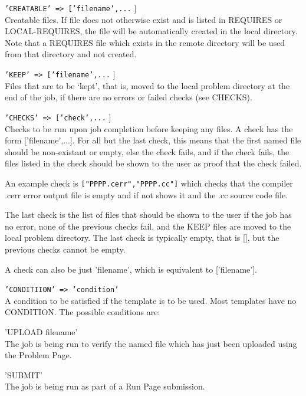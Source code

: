 \documentclass[12pt]{article}
\newenvironment{indpar}[1][0.4in]%
	{\begin{list}{}%
		     {\setlength{\itemsep}{0in}%
		      \setlength{\topsep}{0in}%
		      \setlength{\parsep}{1ex}%
		      \setlength{\labelwidth}{#1}%
		      \setlength{\leftmargin}{#1}%
		      \addtolength{\leftmargin}{\labelsep}}%
	 \item}%
	{\end{list}}
\newenvironment{itemlist}[1][0.2in]%
	{\begin{list}{}{\setlength{\labelwidth}{#1}%
		        \setlength{\leftmargin}{\labelwidth}%
		        \addtolength{\leftmargin}{+0.2in}%
		        \addtolength{\linewidth}{-\labelwidth}%
		        \addtolength{\linewidth}{-0.2in}%
		        \renewcommand{\makelabel}[1]{##1\hfill}}
	 \raggedright}%
	{\end{list}}
\begin{document}
\begin{indpar}[0.2in]
\begin{itemlist}
\item[\tt 'CREATABLE' => ['filename',...]] ~ \\
Creatable files.  If file does not otherwise exist and is
listed in REQUIRES or LOCAL-REQUIRES, the file will be automatically
created in the local directory.  Note that a REQUIRES file which
exists in the remote directory will be used from that directory
and not created.

\item[\tt 'KEEP' => ['filename',...]] ~ \\
Files that are to be `kept', that is, moved to the local problem
directory at the end of the job, if there are no errors or failed
checks (see CHECKS).

\item[\tt 'CHECKS' => ['check',...]] ~ \\
Checks to be run upon job completion before keeping any files.
A check has the form ['filename',...].   For all but the last
check, this means that the first named file should be non-existant
or empty, else the check fails, and if the check fails,
the files listed in the check should be shown to the user as
proof that the check failed.

An example check is \verb|["PPPP.cerr","PPPP.cc"]| which checks
that the compiler .cerr error output file is empty and if not
shows it and the .cc source code file.

The last check is the list of files
that should be shown to the user if the job has no error, none
of the previous checks fail, and the KEEP files are moved to the
local problem directory.  The last check is typically empty, that is [],
but the previous checks cannot be empty.

A check can also be just 'filename',
which is equivalent to ['filename'].

\item[\tt 'CONDITIION' => 'condition'] ~ \\
A condition to be satisfied if the template is to be used.
Most templates have no CONDITION.  The possible conditions are:
\begin{indpar}
\begin{itemlist}
\item['UPLOAD filename'] ~ \\
The job is being run to verify the named file which has
just been uploaded using the Problem Page.
\item['SUBMIT'] ~ \\
The job is being run as part of a Run Page submission.
\end{itemlist}
\end{indpar}

\end{itemlist}
\end{indpar}
\end{document}
